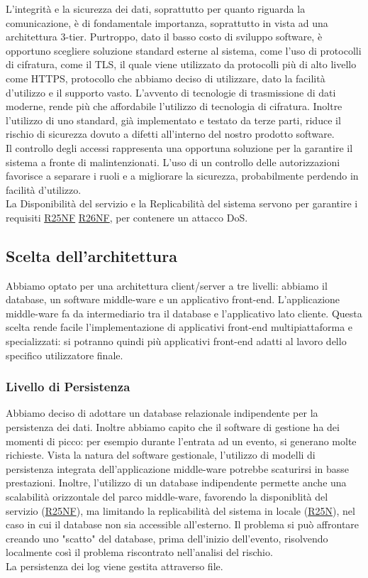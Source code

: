 \documentclass[a4paper]{article}
\begin{document}
L'integrità e la sicurezza dei dati, soprattutto per quanto riguarda la comunicazione, è di fondamentale importanza, soprattutto in vista ad una architettura 3-tier. Purtroppo, dato il basso costo di sviluppo software, è opportuno scegliere soluzione standard esterne al sistema, come l'uso di protocolli di cifratura, come il TLS, il quale viene utilizzato da protocolli più di alto livello come HTTPS, protocollo che abbiamo deciso di utilizzare, dato la facilità d'utilizzo e il supporto vasto. L'avvento di tecnologie di trasmissione di dati moderne, rende più che affordabile l'utilizzo di tecnologia di cifratura. Inoltre l'utilizzo di uno standard, già implementato e testato da terze parti, riduce il rischio di sicurezza dovuto a difetti all'interno del nostro prodotto software.\\Il controllo degli accessi rappresenta una opportuna soluzione per la garantire il sistema a fronte di malintenzionati. L'uso di un controllo delle autorizzazioni favorisce a separare i ruoli e a migliorare la sicurezza, probabilmente perdendo in facilità d'utilizzo.\\La Disponibilità del servizio e la Replicabilità del sistema servono per garantire i requisiti \hyperlink{R25NF}{R25NF} \hyperlink{R26NF}{R26NF}, per contenere un attacco DoS.


\subsection{Scelta dell'architettura}
Abbiamo optato per una architettura client/server a tre livelli: abbiamo il database, un software middle-ware e un applicativo front-end. L'applicazione middle-ware fa da intermediario tra il database e l'applicativo lato cliente. Questa scelta rende facile l'implementazione di applicativi front-end multipiattaforma e specializzati: si potranno quindi più applicativi front-end adatti al lavoro dello specifico utilizzatore finale.

\subsubsection{Livello di Persistenza}
Abbiamo deciso di adottare un database relazionale indipendente per la persistenza dei dati. Inoltre abbiamo capito che il software di gestione ha dei momenti di picco: per esempio durante l'entrata ad un evento, si generano molte richieste. Vista la natura del software gestionale, l'utilizzo di modelli di persistenza integrata dell'applicazione middle-ware potrebbe scaturirsi in basse prestazioni. Inoltre, l'utilizzo di un database indipendente permette anche una scalabilità orizzontale del parco middle-ware, favorendo la disponiblità del servizio (\hyperlink{R25NF}{R25NF}), ma limitando la replicabilità del sistema in locale (\hyperlink{R26NF}{R25N}), nel caso in cui il database non sia accessible all'esterno. Il problema si può affrontare creando uno "scatto" del database, prima dell'inizio dell'evento, risolvendo localmente così il problema riscontrato nell'analisi del rischio.\\La persistenza dei log viene gestita attraverso file.
\end{document}
